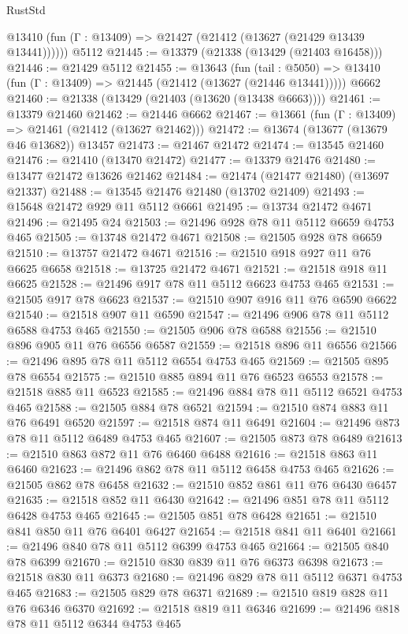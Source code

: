\begin{lexlean}{RustStd}
\begin{coremodule}
      @13410 (fun (Γ : @13409) => @21427 (@21412 (@13627 (@21429 @13439 @13441))))))
    @5112
@21445 := @13379 (@21338 (@13429 (@21403 @16458)))
@21446 := @21429 @5112
@21455 := @13643
    (fun (tail : @5050) => @13410 (fun (Γ : @13409) => @21445 (@21412 (@13627 (@21446 @13441)))))
    @6662
@21460 := @21338 (@13429 (@21403 (@13620 (@13438 @6663))))
@21461 := @13379 @21460
@21462 := @21446 @6662
@21467 := @13661 (fun (Γ : @13409) => @21461 (@21412 (@13627 @21462)))
@21472 := @13674 (@13677 (@13679 @46 @13682)) @13457
@21473 := @21467 @21472
@21474 := @13545 @21460
@21476 := @21410 (@13470 @21472)
@21477 := @13379 @21476
@21480 := @13477 @21472 @13626 @21462
@21484 := @21474 (@21477 @21480) (@13697 @21337)
@21488 := @13545 @21476 @21480 (@13702 @21409)
@21493 := @15648 @21472 @929 @11 @5112 @6661
@21495 := @13734 @21472 @4671
@21496 := @21495 @24
@21503 := @21496 @928 @78 @11 @5112 @6659 @4753 @465
@21505 := @13748 @21472 @4671
@21508 := @21505 @928 @78 @6659
@21510 := @13757 @21472 @4671
@21516 := @21510 @918 @927 @11 @76 @6625 @6658
@21518 := @13725 @21472 @4671
@21521 := @21518 @918 @11 @6625
@21528 := @21496 @917 @78 @11 @5112 @6623 @4753 @465
@21531 := @21505 @917 @78 @6623
@21537 := @21510 @907 @916 @11 @76 @6590 @6622
@21540 := @21518 @907 @11 @6590
@21547 := @21496 @906 @78 @11 @5112 @6588 @4753 @465
@21550 := @21505 @906 @78 @6588
@21556 := @21510 @896 @905 @11 @76 @6556 @6587
@21559 := @21518 @896 @11 @6556
@21566 := @21496 @895 @78 @11 @5112 @6554 @4753 @465
@21569 := @21505 @895 @78 @6554
@21575 := @21510 @885 @894 @11 @76 @6523 @6553
@21578 := @21518 @885 @11 @6523
@21585 := @21496 @884 @78 @11 @5112 @6521 @4753 @465
@21588 := @21505 @884 @78 @6521
@21594 := @21510 @874 @883 @11 @76 @6491 @6520
@21597 := @21518 @874 @11 @6491
@21604 := @21496 @873 @78 @11 @5112 @6489 @4753 @465
@21607 := @21505 @873 @78 @6489
@21613 := @21510 @863 @872 @11 @76 @6460 @6488
@21616 := @21518 @863 @11 @6460
@21623 := @21496 @862 @78 @11 @5112 @6458 @4753 @465
@21626 := @21505 @862 @78 @6458
@21632 := @21510 @852 @861 @11 @76 @6430 @6457
@21635 := @21518 @852 @11 @6430
@21642 := @21496 @851 @78 @11 @5112 @6428 @4753 @465
@21645 := @21505 @851 @78 @6428
@21651 := @21510 @841 @850 @11 @76 @6401 @6427
@21654 := @21518 @841 @11 @6401
@21661 := @21496 @840 @78 @11 @5112 @6399 @4753 @465
@21664 := @21505 @840 @78 @6399
@21670 := @21510 @830 @839 @11 @76 @6373 @6398
@21673 := @21518 @830 @11 @6373
@21680 := @21496 @829 @78 @11 @5112 @6371 @4753 @465
@21683 := @21505 @829 @78 @6371
@21689 := @21510 @819 @828 @11 @76 @6346 @6370
@21692 := @21518 @819 @11 @6346
@21699 := @21496 @818 @78 @11 @5112 @6344 @4753 @465

\end{coremodule}
\end{lexlean}
